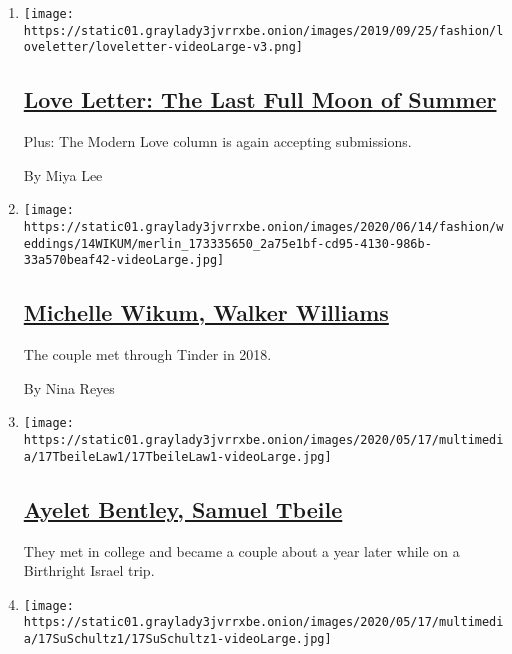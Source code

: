 \begin{enumerate}
\def\labelenumi{\arabic{enumi}.}
\item
  \texttt{[image: https://static01.graylady3jvrrxbe.onion/images/2019/09/25/fashion/loveletter/loveletter-videoLarge-v3.png]}

  \hypertarget{love-letter-the-last-full-moon-of-summer}{%
  \subsection{\texorpdfstring{\href{/2020/09/04/style/love-letter-the-last-full-moon-of-summer-newsletter.html}{Love
  Letter: The Last Full Moon of
  Summer}}{Love Letter: The Last Full Moon of Summer}}\label{love-letter-the-last-full-moon-of-summer}}

  Plus: The Modern Love column is again accepting submissions.

  By Miya Lee
\item
  \texttt{[image: https://static01.graylady3jvrrxbe.onion/images/2020/06/14/fashion/weddings/14WIKUM/merlin\_173335650\_2a75e1bf-cd95-4130-986b-33a570beaf42-videoLarge.jpg]}

  \hypertarget{michelle-wikum-walker-williams}{%
  \subsection{\texorpdfstring{\href{/2020/06/14/fashion/weddings/michelle-wikum-walker-williams.html}{Michelle
  Wikum, Walker
  Williams}}{Michelle Wikum, Walker Williams}}\label{michelle-wikum-walker-williams}}

  The couple met through Tinder in 2018.

  By Nina Reyes
\item
  \texttt{[image: https://static01.graylady3jvrrxbe.onion/images/2020/05/17/multimedia/17TbeileLaw1/17TbeileLaw1-videoLarge.jpg]}

  \hypertarget{ayelet-bentley-samuel-tbeile}{%
  \subsection{\texorpdfstring{\href{/2020/05/17/fashion/weddings/ayelet-bentley-samuel-tbeile.html}{Ayelet
  Bentley, Samuel
  Tbeile}}{Ayelet Bentley, Samuel Tbeile}}\label{ayelet-bentley-samuel-tbeile}}

  They met in college and became a couple about a year later while on a
  Birthright Israel trip.
\item
  \texttt{[image: https://static01.graylady3jvrrxbe.onion/images/2020/05/17/multimedia/17SuSchultz1/17SuSchultz1-videoLarge.jpg]}


\end{enumerate}

